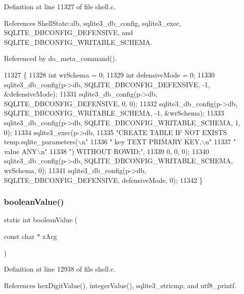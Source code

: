 Definition at line 11327 of file shell.\+c.



References Shell\+State\+::db, sqlite3\+\_\+db\+\_\+config, sqlite3\+\_\+exec, S\+Q\+L\+I\+T\+E\+\_\+\+D\+B\+C\+O\+N\+F\+I\+G\+\_\+\+D\+E\+F\+E\+N\+S\+I\+VE, and S\+Q\+L\+I\+T\+E\+\_\+\+D\+B\+C\+O\+N\+F\+I\+G\+\_\+\+W\+R\+I\+T\+A\+B\+L\+E\+\_\+\+S\+C\+H\+E\+MA.



Referenced by do\+\_\+meta\+\_\+command().


\begin{DoxyCode}
11327                                           \{
11328   \textcolor{keywordtype}{int} wrSchema = 0;
11329   \textcolor{keywordtype}{int} defensiveMode = 0;
11330   sqlite3_db_config(p->db, SQLITE_DBCONFIG_DEFENSIVE, -1, &defensiveMode);
11331   sqlite3_db_config(p->db, SQLITE_DBCONFIG_DEFENSIVE, 0, 0);
11332   sqlite3_db_config(p->db, SQLITE_DBCONFIG_WRITABLE_SCHEMA, -1, &wrSchema);
11333   sqlite3_db_config(p->db, SQLITE_DBCONFIG_WRITABLE_SCHEMA, 1, 0);
11334   sqlite3_exec(p->db,
11335     \textcolor{stringliteral}{"CREATE TABLE IF NOT EXISTS temp.sqlite\_parameters(\(\backslash\)n"}
11336     \textcolor{stringliteral}{"  key TEXT PRIMARY KEY,\(\backslash\)n"}
11337     \textcolor{stringliteral}{"  value ANY\(\backslash\)n"}
11338     \textcolor{stringliteral}{") WITHOUT ROWID;"},
11339     0, 0, 0);
11340   sqlite3_db_config(p->db, SQLITE_DBCONFIG_WRITABLE_SCHEMA, wrSchema, 0);
11341   sqlite3_db_config(p->db, SQLITE_DBCONFIG_DEFENSIVE, defensiveMode, 0);
11342 \}
\end{DoxyCode}
\mbox{\label{shell_8c_ad04a5f42b16e4ed5493b42c2d03eaf4b}} 
\subsubsection{boolean\+Value()}
{\footnotesize\ttfamily static int boolean\+Value (\begin{DoxyParamCaption}\item[{const char $\ast$}]{z\+Arg }\end{DoxyParamCaption})\hspace{0.3cm}{\ttfamily [static]}}



Definition at line 12938 of file shell.\+c.



References hex\+Digit\+Value(), integer\+Value(), sqlite3\+\_\+stricmp, and utf8\+\_\+printf.



